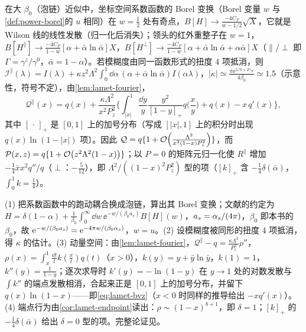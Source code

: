 \begin{proposition}\label{prop:lamet-bvz}
在大 $\beta_0$（泡链）近似中，坐标空间系数函数的 Borel 变换（Borel 变量 $w$ 与\cref{def:power-borel}的 $u$ 相同）在 $w=\frac12$ 处有奇点，$B[H]\to\frac{-4C_F}{w-1/2}\sqrt X$，它就是 Wilson 线的线性发散（归一化后消失）；领头的红外重整子在 $w=1$，$B[H^\parallel]\to\frac{-4C_F}{1-w}[\alpha+\bar\alpha\ln\bar\alpha]X$，$B[H^\perp]\to\frac{-4C_F}{1-w}[\alpha+\bar\alpha\ln\bar\alpha+\alpha\bar\alpha]X$（$\parallel/\perp$ 即 $\Gamma=\gamma^z/\gamma^0$，$\bar\alpha=1-\alpha$）。若模糊度由同一函数形式的扭度 4 项抵消，则 $\mathcal I^\parallel(\lambda)=I(\lambda)+\kappa z^2\Lambda^2\int_0^1\dd\alpha\,(\alpha+\bar\alpha\ln\bar\alpha)I(\alpha\lambda)$，$|\kappa|\simeq\frac{\pi\ee^{5/3+2\gamma_E}}{4\beta_0}\simeq1.5$（示意性，符号不定），由\cref{lem:lamet-fourier}，
\begin{equation}\label{eq:lamet-bvz}
\mathcal Q^\parallel(x)=q(x)+\frac{\kappa\Lambda^2}{x^2P_z^2}\Big\{\int_{|x|}^1\frac{\dd y}y\frac{y^2}{[1-y]_+}q\Big(\frac xy\Big)+q(x)-x\,q'(x)\Big\},
\end{equation}%
其中 $[\,\cdot\,]_+$ 是 $[0,1]$ 上的加号分布（写成 $[|x|,1]$ 上的积分时出现 $q(x)\ln(1-|x|)$ 项）。因此 $\mathcal Q=q\{1+\mathcal{O}\!\left(\frac{\Lambda^2}{x^2(1-x)P_z^2}\right)\}$，而 $\mathcal P(x,z)=q\{1+\mathcal{O}\!\left(z^2\Lambda^2(1-x)\right)\}$；以 $P=0$ 的矩阵元归一化使 $R^\parallel$ 增加 $-\frac14\bar xx^2q''/q$（$\perp$：$-\frac5{12}$），即 $\Lambda^2/((1-x)^2P_z^2)$ 型的项（$[k]_+$ 含 $-\frac14\delta(\bar\alpha)$，$\int_0^1k=\frac14$）。
\end{proposition}

\begin{proofsketch}
(1) 把系数函数中的跑动耦合换成泡链，算出其 Borel 变换\cite{Braun:2018brg}；文献的约定为 $H=\delta(1-\alpha)+\frac1{\beta_0}\int_0^\infty\dd w\,\ee^{-w/(\beta_0a_s)}B[H](w)$，$a_s=\alpha_s/(4\pi)$，$\beta_0$ 即本书的 $\beta_0$，故 $\mathrm{e}^{-w/(\beta_0a_s)}=\mathrm{e}^{-4\pi w/(\beta_0\alpha_s)}$，$w=u$。(2) 设模糊度被同形的扭度 4 项抵消，得 $\kappa$ 的估计。(3) 动量空间：由\cref{lem:lamet-fourier}，$\mathcal Q^\parallel-q=\frac{\kappa\Lambda^2}{P_z^2}\rho''$，$\rho(x)=\int_x^1\frac{\dd t}tk(\frac xt)q(t)$（$x>0$），$k(y)=y+\bar y\ln\bar y$，$k(1)=1$，$k''(y)=\frac1{1-y}$；逐次求导时 $k'(y)=-\ln(1-y)$ 在 $y\to1$ 处的对数发散与 $\int k''$ 的端点发散相消，合起来正是 $[0,1]$ 上的加号分布，并留下 $q(x)\ln(1-x)$——即\cref{eq:lamet-bvz}（$x<0$ 时同样的推导给出 $-xq'(x)$）。(4) 端点行为由\cref{cor:lamet-endpoint}读出：$\rho\sim(1-x)^{b+1}$，即 $\delta=1$；$[k]_+$ 的 $-\frac14\delta(\bar\alpha)$ 给出 $\delta=0$ 型的项。完整论证见\cite{Braun:2018brg}。
\end{proofsketch}

